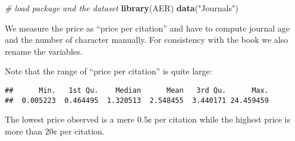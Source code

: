 \documentclass[]{book}
\newenvironment{Shaded}{\begin{snugshade}}{\end{snugshade}}
\newcommand{\KeywordTok}[1]{\textcolor[rgb]{0.13,0.29,0.53}{\textbf{#1}}}
\newcommand{\DecValTok}[1]{\textcolor[rgb]{0.00,0.00,0.81}{#1}}
\newcommand{\StringTok}[1]{\textcolor[rgb]{0.31,0.60,0.02}{#1}}
\newcommand{\CommentTok}[1]{\textcolor[rgb]{0.56,0.35,0.01}{\textit{#1}}}
\newcommand{\OperatorTok}[1]{\textcolor[rgb]{0.81,0.36,0.00}{\textbf{#1}}}
\newcommand{\NormalTok}[1]{#1}
\theoremstyle{definition}
\theoremstyle{definition}
\theoremstyle{definition}
\theoremstyle{remark}
\begin{document}
\begin{Shaded}
\begin{Highlighting}[]
\CommentTok{# load package and the dataset}
\KeywordTok{library}\NormalTok{(AER)}
\KeywordTok{data}\NormalTok{(}\StringTok{"Journals"}\NormalTok{)}
\end{Highlighting}
\end{Shaded}

We measure the price as ``price per citation'' and have to compute
journal age and the number of character manually. For consistency with
the book we also rename the variables.

\begin{Shaded}
\end{Shaded}

Note that the range of ``price per citation'' is quite large:

\begin{Shaded}
\end{Shaded}

\begin{verbatim}
##      Min.   1st Qu.    Median      Mean   3rd Qu.      Max. 
##  0.005223  0.464495  1.320513  2.548455  3.440171 24.459459
\end{verbatim}

The lowest price observed is a mere \(0.5\)¢ per citation while the
highest price is more than \(20\)¢ per citation.
\end{document}
